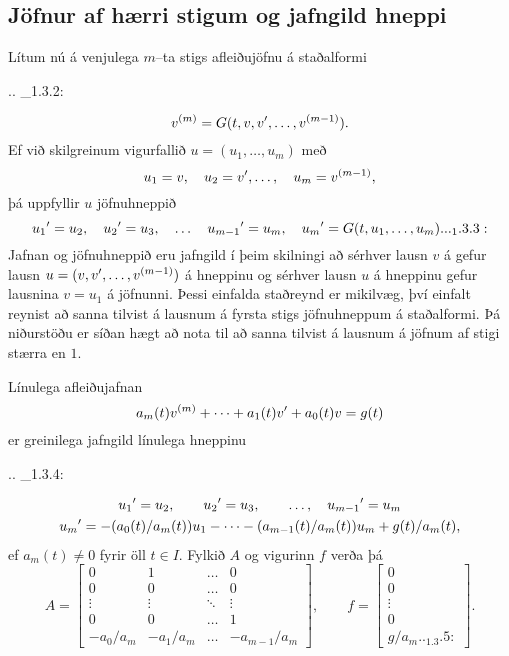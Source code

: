 \subsection*{Jöfnur af hærri stigum og jafngild hneppi}

Lítum nú á venjulega $m$--ta stigs afleiðujöfnu á staðalformi

.. _1.3.2:

\begin{equation*}v\sp{(m)}=G(t,v,v{\sp{\prime}},\dots,v\sp{(m-1)}).
\end{equation*}
Ef við skilgreinum vigurfallið $u=(u_1,\dots,u_m)$ með
$$u_1=v, \quad u_2=v{\sp{\prime}},\dots, \quad  u_m=v\sp{(m-1)},
$$ þá uppfyllir $u$
jöfnuhneppið
 \begin{equation*}
u_1\dash = u_2, \quad
u_2\dash = u_3, \quad\dots \quad
u_{m-1}\dash = u_m, \quad
u_m\dash =G(t, u_1,\dots,u_m). 


.. _1.3.3:

 \end{equation*}
Jafnan og jöfnuhneppið eru jafngild í þeim skilningi
að sérhver lausn $v$ á  gefur lausn
$u=(v,v{\sp{\prime}},\dots,v\sp{(m-1)})$ á hneppinu og sérhver lausn $u$ á
hneppinu  gefur lausnina $v=u_1$ á jöfnunni.  Þessi einfalda staðreynd
er mikilvæg, því einfalt reynist  að sanna tilvist á lausnum á fyrsta
stigs jöfnuhneppum á staðalformi.  Þá niðurstöðu er síðan hægt að nota
til að sanna tilvist á lausnum á jöfnum af stigi stærra en $1$.  

Línulega afleiðujafnan
 $$a_m(t)v^{(m)}+\cdots+a_1(t)v{\sp{\prime}}+ a_0(t)v=g(t)
 $$
er greinilega jafngild línulega hneppinu

.. _1.3.4:

\begin{gather*}
u_1{\sp{\prime}} = u_2,\qquad  u_2{\sp{\prime}} = u_3, \qquad \dots, \quad
u_{m-1}{\sp{\prime}} = u_m\\
u_m{\sp{\prime}}
=-(a_0(t)/a_m(t))u_1-\cdots-(a_{m-1}(t)/a_m(t))u_m+g(t)/a_m(t),\nonumber 
\end{gather*}
ef $a_m(t)\neq 0$ fyrir öll $t\in I$.
Fylkið $A$ og vigurinn $f$ verða þá 
\begin{equation*}A=\left[\begin{matrix}
0&1&\dots&0\\
0&0&\dots&0\\
\vdots&\vdots&\ddots&\vdots\\
0&0&\dots&1\\
-a_0/a_m&-a_1/a_m&\dots&-a_{m-1}/a_m
\end{matrix}\right],
\qquad
f=\left[\begin{matrix}
0\\
0\\
\vdots\\
0\\
g/a_m

.. _1.3.5:

\end{matrix}\right].
\end{equation*}
 
